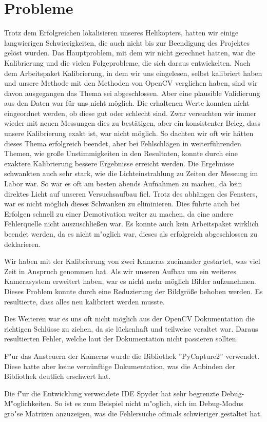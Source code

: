 \chapter{Probleme}
\label{cha:probleme}

Trotz dem Erfolgreichen lokalisieren unseres Helikopters, hatten wir einige langwierigen Schwierigkeiten, die auch nicht bis zur Beendigung des Projektes gelöst wurden. Das Hauptproblem, mit dem wir nicht gerechnet hatten, war die Kalibrierung und die vielen Folgeprobleme, die sich daraus entwickelten. Nach dem Arbeitspaket Kalibrierung, in dem wir uns eingelesen, selbst kalibriert haben und unsere Methode mit den Methoden von OpenCV verglichen haben, sind wir davon ausgegangen das Thema sei abgeschlossen. Aber eine plausible Validierung aus den Daten war für uns nicht möglich. Die erhaltenen Werte konnten nicht eingeordnet werden, ob diese gut oder schlecht sind. Zwar versuchten wir immer wieder mit neuen Messungen dies zu bestätigen, aber ein konsistenter Beleg, dass unsere Kalibrierung exakt ist, war nicht möglich. So dachten wir oft wir hätten dieses Thema erfolgreich beendet, aber bei Fehlschlägen in weiterführenden Themen, wie große Unstimmigkeiten in den Resultaten, konnte durch eine exaktere Kalibrierung bessere Ergebnisse erreicht werden. Die Ergebnisse schwankten auch sehr stark, wie die Lichteinstrahlung zu Zeiten der Messung im Labor war. So war es oft am besten abends Aufnahmen zu machen, da kein direktes Licht auf unseren Versuchsaufbau fiel. Trotz des abhängen des Fensters, war es nicht möglich dieses Schwanken zu eliminieren. Dies führte auch bei Erfolgen schnell zu einer Demotivation weiter zu machen, da eine andere Fehlerquelle nicht auszuschließen war. Es konnte auch kein Arbeitspaket wirklich beendet werden, da es nicht m"oglich war, dieses als erfolgreich abgeschlossen zu deklarieren.

\noindent Wir haben mit der Kalibrierung von zwei Kameras zueinander gestartet, was viel Zeit in Anspruch genommen hat. Als wir unseren Aufbau um ein weiteres Kamerasystem erweitert haben, war es nicht mehr möglich Bilder aufzunehmen. Dieses Problem konnte durch eine Reduzierung der Bildgröße behoben werden. Es resultierte, dass alles neu kalibriert werden musste.\newline

\noindent Des Weiteren war es uns oft nicht möglich aus der OpenCV Dokumentation die richtigen Schlüsse zu ziehen, da sie lückenhaft und teilweise veraltet war. Daraus resultierten Fehler, welche laut der Dokumentation nicht passieren sollten.\newline

\noindent F"ur das Ansteuern der Kameras wurde die Bibliothek ''PyCapture2'' verwendet. Diese hatte aber keine vernünftige Dokumentation, was die Anbinden der Bibliothek deutlich erschwert hat.\newline

\noindent Die f"ur die Entwicklung verwendete IDE Spyder hat sehr begrenzte Debug-M"oglichkeiten. So ist es zum Beispiel nicht m"oglich, sich im Debug-Modus gro"se Matrizen anzuzeigen, was die Fehlersuche oftmals schwieriger gestaltet hat.
